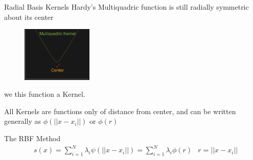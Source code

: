 \documentclass[12pt,t]{beamer}
\newcommand{\subt}[1]{{\footnotesize \color{subtitle} {#1}}}
\begin{document}
\begin{frame}{Radial Basis Kernels}
Hardy's Multiquadric function is still \subt{radially symmetric} about its center


\begin{figure}
\includegraphics[width=0.3\textwidth, keepaspectratio]{kernelfun.png}
\end{figure}
we this function a Kernel. 

All Kernels are functions only of distance from center, and can be written generally as $\phi(||x-x_i||)$ or $\phi(r)$

\subt{The RBF Method}
\begin{align*}
&s(x)=\sum_{i=1}^N \lambda_i \psi(||x-x_i||)=\sum_{i=1}^N \lambda_i \phi(r) &r=||x-x_i||
\end{align*}

\note{}
\end{frame}
\end{document}

